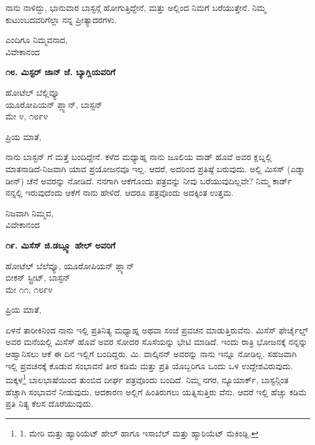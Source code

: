 ನಾನು ನಾಳಿದ್ದು, ಭಾನುವಾರ ಬಾಸ್ಟನ್ಗೆ ಹೋಗುತ್ತಿದ್ದೇನೆ, ಮತ್ತು ಅಲ್ಲಿಂದ ನಿಮಗೆ ಬರೆಯುತ್ತೇನೆ. ನಿಮ್ಮ ಕುಟುಂಬದವರಿಗೆಲ್ಲಾ ನನ್ನ ಪ್ರೀತ್ಯಾದರಗಳು.

\begin{flushright}
ಎಂದಿಗೂ ನಿಮ್ಮವನಾದ,\\ವಿವೇಕಾನಂದ
\end{flushright}

\begin{center}
\textbf{೧೮. ಮಿಸ್ಟರ್ ಜಾನ್ ಜೆ. ಬ್ಯಾಗ್ಲಿಯವರಿಗೆ}
\end{center}

\begin{flushright}
ಹೋಟೆಲ್ ಬೆಲ್ಲಿವ್ಯೂ\\ಯೂರೋಪಿಯನ್ ಪ್ಲ್ಯಾನ್, ಬಾಸ್ಟನ್\\ಮೇ ೪, ೧೮೯೪
\end{flushright}

ಪ್ರಿಯ ಮಾತೆ,

ನಾನು ಬಾಸ್ಟನ್ ಗೆ ಮತ್ತೆ ಬಂದಿದ್ದೇನೆ. ಕಳೆದ ಮಧ್ಯಾಹ್ನ ನಾನು ಜೂಲಿಯ ವಾಡ್ ಹೊವೆ ಅವರ ಕ್ಲಬ್ನಲ್ಲಿ ಮಾತನಾಡಿದೆ-ನಿಜವಾಗಿ ಯಾವ ಪ್ರಯೋಜನವೂ ಇಲ್ಲ. ಆದರೆ, ಅದರಿಂದ ಪ್ರತಿಷ್ಠೆ ಬರುವುದು. ಅಲ್ಲಿ ಮಿಸಸ್ (ಎಡ್ನಾ ಡೀನ್) ಚೆನೆ ಅವರನ್ನು ನೋಡಿದೆ. ನನಗಾಗಿ ಆಕೆಗೊಂದು ಪತ್ರವನ್ನು ನೀವು ಬರೆಯುವುದಿಲ್ಲವೇ? ನಿಮ್ಮ ಕಾರ್ಡ್ ನನ್ನಲ್ಲಿ ಇರುವುದೆಂದು ಆಕೆಗೆ ನಾನು ಹೇಳಿದೆ. ಆದರೂ ಪತ್ರವೊಂದು ಅದಕ್ಕಿಂತ ಉತ್ತಮ.

\begin{flushright}
ನಿಜವಾಗಿ ನಿಮ್ಮವ,\\ವಿವೇಕಾನಂದ
\end{flushright}

\begin{center}
\textbf{೧೯. ಮಿಸೆಸ್ ಜಿ.ಡಬ್ಲ್ಯೂ ಹೇಲ್ ಅವರಿಗೆ}
\end{center}

\begin{flushright}
ಹೋಟೆಲ್ ಬೆಲೆವ್ಯೂ, ಯೂರೋಪಿಯನ್ ಪ್ಲ್ಯಾನ್\\ಬೀಕನ್ ಸ್ಟ್ರೀಟ್, ಬಾಸ್ಟನ್\\ಮೇ ೧೧, ೧೮೯೪
\end{flushright}

ಪ್ರಿಯ ಮಾತೆ,

ಏಳನೆ ತಾರೀಕಿನಿಂದ ನಾನು ಇಲ್ಲಿ ಪ್ರತಿನಿತ್ಯ ಮಧ್ಯಾಹ್ನ ಅಥವಾ ಸಂಜೆ ಪ್ರವಚನ ಮಾಡುತ್ತಿರುವೆನು. ಮಿಸೆಸ್ ಫೇರ್ಚೈಲ್ಡ್ ಅವರ ಮನೆಯಲ್ಲಿ ಮಿಸೆಸ್ ಹೊವೆ ಅವರ ಸೋದರ ಸೊಸೆಯನ್ನು ಭೇಟಿ ಮಾಡಿದೆ. ಇಂದು ರಾತ್ರಿ ಭೋಜನಕ್ಕೆ ನನ್ನನ್ನು ಆಹ್ವಾನಿಸಲು ಆಕೆ ಈ ದಿನ ಇಲ್ಲಿಗೆ ಬಂದಿದ್ದರು. ಮಿ. ವಾಲ್ಕಿನನ್ ಅವರನ್ನು ನಾನು ಇನ್ನೂ ನೋಡಿಲ್ಲ. ಸಹಜವಾಗಿ ಇಲ್ಲಿ ಪ್ರವಚನಕ್ಕೆ ಕೊಡುವ ಸಂಭಾವನೆ ತೀರ ಕಡಿಮೆ ಮತ್ತು ಪ್ರತಿ ಯೊಬ್ಬರಿಗೂ ಒಂದು ಒಳ ಉದ್ದೇಶವಿರುವುದು. ಮಕ್ಕಳ\footnote{1. ಮೇರಿ ಮತ್ತು ಹ್ಯಾರಿಯೆಟ್ ಹೇಲ್ ಹಾಗೂ ಇಸಾಬೆಲ್ ಮತ್ತು ಹ್ಯಾರಿಯೆಟ್ ಮೆಕಿಂಡ್ಲಿ.} ಬಾಲಭಾಷೆಯಿಂದ ತುಂಬಿದ ದೀರ್ಘ ಪತ್ರವೊಂದು ಬಂದಿದೆ. ನಿಮ್ಮ ನಗರ, ನ್ಯೂಯಾರ್ಕ್, ಬಾಸ್ಟನ್ಗಿಂತ ಹೆಚ್ಚಾಗಿ ಸಂಭಾವನೆ ನೀಡುವುದು, ಆದಕಾರಣ ಅಲ್ಲಿಗೆ ಹಿಂತಿರುಗಲು ಯತ್ನಿಸುತ್ತಿರು ವೆನು. ಆದರೆ ಇಲ್ಲಿ ಹೆಚ್ಚು ಕಡಿಮೆ ಪ್ರತಿ ನಿತ್ಯ ಕೆಲಸ ದೊರೆಯುವುದು.

